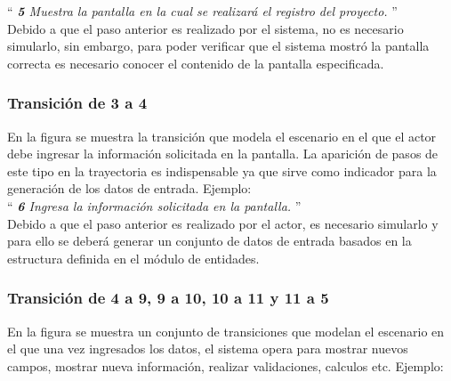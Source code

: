   ``{\it
    {\bf 5} \UCsist Muestra la pantalla  en la cual se realizará el registro del proyecto. 
   } ''\\
	
  	Debido a que el paso anterior es realizado por el sistema, no es necesario simularlo, sin embargo, para poder verificar que el sistema mostró la pantalla correcta es necesario conocer el contenido de la pantalla especificada. 
	
\subsubsection{Transición de 3 a 4}


En la figura  se muestra la transición que modela el escenario en el que el actor debe ingresar la información solicitada en la pantalla.
 La aparición de pasos de este tipo en la trayectoria es indispensable ya que sirve como indicador para la generación de los datos de entrada. Ejemplo:\\
   
   ``{\it
    {\bf 6} \UCactor Ingresa la información solicitada en la pantalla. 
   }''\\
	
  	Debido a que el paso anterior es realizado por el actor, es necesario simularlo y para ello se deberá generar un conjunto de datos de entrada basados en la estructura definida en el módulo de entidades.

  
 \subsubsection{Transición de 4 a 9, 9 a 10, 10 a 11 y 11 a 5} 
 
 En la figura  se muestra un conjunto de transiciones que modelan el escenario en el que una vez ingresados los datos, el sistema opera para mostrar nuevos campos, mostrar nueva información, realizar validaciones, calculos etc. Ejemplo:\\

